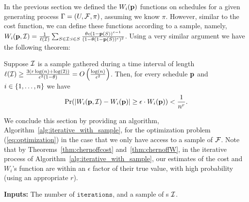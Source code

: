 In the previous section we defined the $W_i(\p)$ functions on schedules for a given generating process $\sys=(U,\F,\pi)$, assuming we know $\pi$. However, similar to the cost function, we can define these functions according to a sample, namely, 
$W_i(\p,\S) = \frac{1}{\ell(\S)}\sum_{S\in \S: i\in S} \frac{\theta c (1-\p(S))^{c-1}}{(1-\theta(1-\p(S))^c)^2}$.
Using a very similar argument we have the following theorem:
\begin{theorem}\label{thm:chernoffW}
 Suppose $\S$ is a sample gathered during a time interval of length $\ell(\S) \geq \frac{3(r\log(n)+\log(2))}{\epsilon^2(1-\theta)} = O\paran{\frac{\log(n)}{\epsilon^2}}$. Then, for every schedule $\p$ and $i\in\set{1,\dots,n}$ we have
 $$\pr(|W_i(\p,\S) - W_i(\p)|\geq \epsilon\cdot W_i(\p)) < \frac{1}{n^r}.$$
\end{theorem}

We conclude this section by providing an algorithm, Algorithm~\ref{alg:iterative_with_sample}, for the optimization problem (\ref{eq:optimization}) in the case that we only have access to a sample of $\F$. Note that by Theorems~\ref{thm:chernoffcost} and~\ref{thm:chernoffW}, in the iterative process of Algorithm~\ref{alg:iterative_with_sample}, our estimates of the cost and $W_i$'s function are within an $\epsilon$ factor of their true value, with high probability (using an appropriate $r$).

\begin{algorithm}[!h]
\BlankLine
{\bf Inputs:} The number of  $\texttt{iterations}$, and a sample of {\ins}s $\S$.

\caption{$\appoptimizer(\texttt{iterations},\S)$}\label{alg:iterative_with_sample}
\end{algorithm}  









